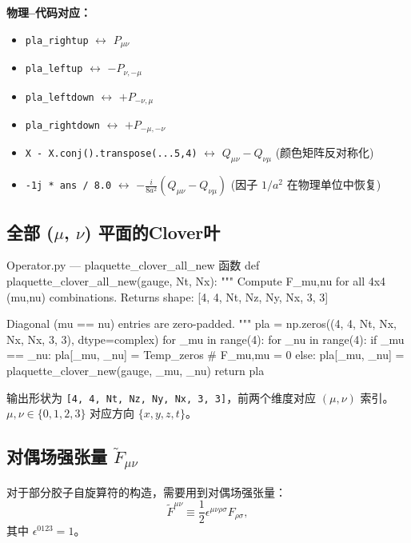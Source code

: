 \documentclass[12pt,a4paper]{ctexart}
\begin{document}
\textbf{物理--代码对应：}
\begin{itemize}
    \item \texttt{pla\_rightup} $\longleftrightarrow$ $P_{\mu\nu}$
    \item \texttt{pla\_leftup} $\longleftrightarrow$ $-P_{\nu,-\mu}$
    \item \texttt{pla\_leftdown} $\longleftrightarrow$ $+P_{-\nu,\mu}$
    \item \texttt{pla\_rightdown} $\longleftrightarrow$ $+P_{-\mu,-\nu}$
    \item \texttt{X - X.conj().transpose(...5,4)} $\longleftrightarrow$
        $Q_{\mu\nu} - Q_{\nu\mu}$ (颜色矩阵反对称化)
    \item \texttt{-1j * ans / 8.0} $\longleftrightarrow$
        $-\frac{i}{8a^{2}}(Q_{\mu\nu} - Q_{\nu\mu})$ (因子 $1/a^{2}$ 在物理单位中恢复)
\end{itemize}

\subsection{全部 ($\mu$, $\nu$) 平面的Clover叶}

\begin{codeblock}{Operator.py --- plaquette\_clover\_all\_new 函数}
def plaquette_clover_all_new(gauge, Nt, Nx):
    """
    Compute F_{mu,nu} for all 4x4 (mu,nu) combinations.
    Returns shape: [4, 4, Nt, Nz, Ny, Nx, 3, 3]

    Diagonal (mu == nu) entries are zero-padded.
    """
    pla = np.zeros((4, 4, Nt, Nx, Nx, Nx, 3, 3), dtype=complex)
    for _mu in range(4):
        for _nu in range(4):
            if _mu == _nu:
                pla[_mu, _nu] = Temp_zeros   # F_{mu,mu} = 0
            else:
                pla[_mu, _nu] = plaquette_clover_new(gauge, _mu, _nu)
    return pla
\end{codeblock}

输出形状为 \texttt{[4, 4, Nt, Nz, Ny, Nx, 3, 3]}，前两个维度对应 $(\mu,\nu)$
索引。$\mu, \nu \in \{0,1,2,3\}$ 对应方向 $\{x, y, z, t\}$。

\subsection{对偶场强张量 $\tilde{F}_{\mu\nu}$}

对于部分胶子自旋算符的构造，需要用到对偶场强张量\cite{gluon_pdf_derivation}：
\begin{equation}
\tilde{F}^{\mu\nu} \equiv \frac{1}{2} \epsilon^{\mu\nu\rho\sigma} F_{\rho\sigma},
\end{equation}
其中 $\epsilon^{0123} = 1$。
\end{document}
